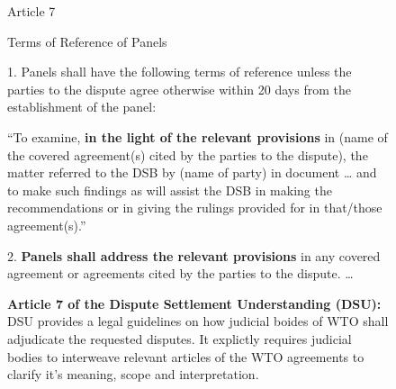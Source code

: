 \begin{figure}
  \begin{displayquote}[][]
    \begin{center}
      Article 7
    \end{center}
    \begin{center}
      Terms of Reference of Panels
    \end{center}
  
    1. Panels shall have the following terms of reference unless the parties to the dispute
    agree otherwise within 20 days from the establishment of the panel:
  
    \begin{displayquote}[][]
  
      ``To examine, \textbf{in the light of the relevant provisions} in (name of the covered
      agreement(s) cited by the parties to the dispute), the matter referred to the DSB by
      (name of party) in document … and to make such findings as will assist the DSB in
      making the recommendations or in giving the rulings provided for in that/those
      agreement(s).''
        
    \end{displayquote}
  
    2. \textbf{Panels shall address the relevant provisions} in any covered agreement or agreements
    cited by the parties to the dispute. \ldots
  \end{displayquote}
  \caption{\textbf{Article 7 of the Dispute Settlement Understanding (DSU): } 
  DSU provides a legal guidelines on how judicial boides of WTO shall adjudicate the requested disputes.
  It explictly requires judicial bodies to interweave relevant articles of the WTO agreements to clarify
  it's meaning, scope and interpretation.
  } 
  \label{fig:art7dsu}
\end{figure}

